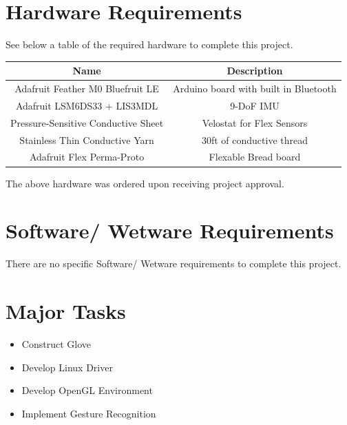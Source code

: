 \documentclass[12pt,a4paper,oneside]{book}
\theoremstyle{plain}
\numberwithin{equation}{chapter}
\newcounter{Secnum}
\begin{document}

\section{Hardware Requirements}

\noindent See below a table of the required hardware to complete this project.

\begin{center}
    \begin{tabular}{ |c|c| }
        \hline
        Name & Description \\
        \hline
        \hline
        Adafruit Feather M0 Bluefruit LE & Arduino board with built in Bluetooth \\
        \hline
        Adafruit LSM6DS33 + LIS3MDL & 9-DoF IMU \\
        \hline
        Pressure-Sensitive Conductive Sheet & Velostat for Flex Sensors \\
        \hline
        Stainless Thin Conductive Yarn & 30ft of conductive thread \\
        \hline
        Adafruit Flex Perma-Proto & Flexable Bread board \\
        \hline
    \end{tabular}
\end{center}

\noindent The above hardware was ordered upon receiving project approval.

\section{Software/ Wetware Requirements}

\noindent There are no specific Software/ Wetware requirements to complete this project.

\section{Major Tasks}

\begin{itemize}
    \item Construct Glove
    \item Develop Linux Driver
    \item Develop OpenGL Environment
    \item Implement Gesture Recognition
\end{itemize}
\end{document}
